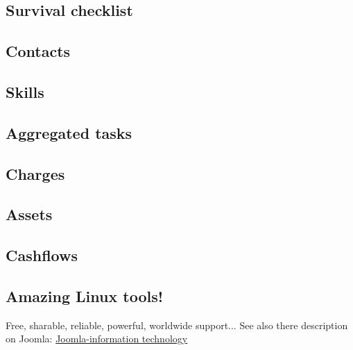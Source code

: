 
%
\subsection{Survival checklist}

\subsection{Contacts}

\subsection{Skills}

%
\subsection{Aggregated tasks}

\subsection{Charges}

%
%
\subsection{Assets}

\subsection{Cashflows}

\subsection{Amazing Linux tools!}
Free, sharable, reliable, powerful, worldwide support...
See also there description on Joomla: \href{http://localhost/Joomla/index.php/home-3}{Joomla-information technology}


%

